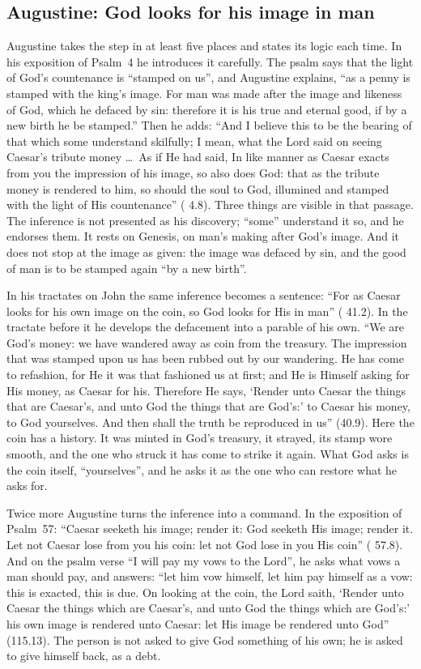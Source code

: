 \subsection{Augustine: God looks for his image in man}

Augustine takes the step in at least five places and states its logic each
time. In his exposition of Psalm~4 he introduces it carefully. The psalm says
that the light of God's countenance is ``stamped on us'', and Augustine
explains, ``as a penny is stamped with the king's image. For man was made after
the image and likeness of God, which he defaced by sin: therefore it is his true
and eternal good, if by a new birth he be stamped.'' Then he adds: ``And I
believe this to be the bearing of that which some understand skilfully; I
mean, what the Lord said on seeing Caesar's tribute money \ldots\ As if He had
said, In like manner as Caesar exacts from you the impression of his image, so
also does God: that as the tribute money is rendered to him, so should the
soul to God, illumined and stamped with the light of His countenance''
( 4.8). Three things are visible in that passage.
The inference is not presented as his discovery; ``some'' understand it so,
and he endorses them. It rests on Genesis, on man's making after God's image.
And it does not stop at the image as given: the image was defaced by sin, and
the good of man is to be stamped again ``by a new birth''.

In his tractates on John the same inference becomes a sentence: ``For as Caesar
looks for his own image on the coin, so God looks for His in man''
( 41.2). In the tractate before it he
develops the defacement into a parable of his own. ``We are God's money: we
have wandered away as coin from the treasury. The impression that was stamped
upon us has been rubbed out by our wandering. He has come to refashion, for He
it was that fashioned us at first; and He is Himself asking for His money, as
Caesar for his. Therefore He says, `Render unto Caesar the things that are
Caesar's, and unto God the things that are God's:' to Caesar his money, to God
yourselves. And then shall the truth be reproduced in us'' (40.9). Here the
coin has a history. It was minted in God's treasury, it strayed, its stamp wore
smooth, and the one who struck it has come to strike it again. What God asks
is the coin itself, ``yourselves'', and he asks it as the one who can restore
what he asks for.

Twice more Augustine turns the inference into a command. In the exposition of
Psalm~57: ``Caesar seeketh his image; render it: God seeketh His image; render
it. Let not Caesar lose from you his coin: let not God lose in you His coin''
( 57.8). And on the psalm verse ``I will pay my
vows to the Lord'', he asks what vows a man should pay, and answers: ``let him
vow himself, let him pay himself as a vow: this is exacted, this is due. On
looking at the coin, the Lord saith, `Render unto Caesar the things which are
Caesar's, and unto God the things which are God's:' his own image is rendered
unto Caesar: let His image be rendered unto God'' (115.13). The person is not
asked to give God something of his own; he is asked to give himself back, as
a debt.

